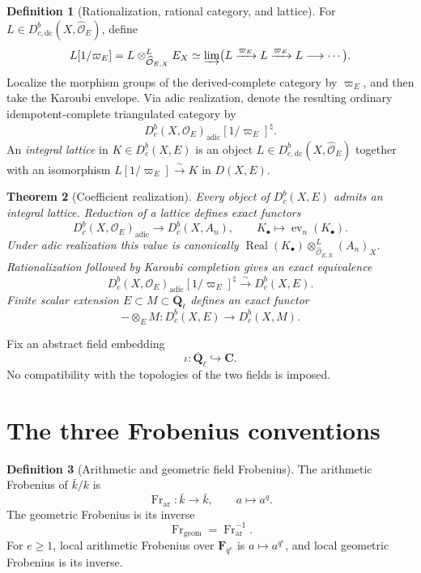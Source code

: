 \documentclass[10pt]{article}
\newtheorem{theorem}{Theorem}[section]
\theoremstyle{definition}
\newtheorem{definition}[theorem]{Definition}
\newcommand{\Qlb}{\overline{\mathbf Q}_\ell}
\newcommand{\Dbc}{D^b_c}
\newcommand{\Fr}{\operatorname{Fr}}
\begin{document}
\begin{definition}[Rationalization, rational category, and lattice]
For \(L\in D^b_{c,\mathrm{dc}}(X,\widehat{\mathcal O}_E)\), define
\[
 L[1/\varpi_E]
   =L\otimes^L_{\widehat{\mathcal O}_{E,X}}E_X
   \simeq\varinjlim\bigl(L\xrightarrow{\varpi_E}L
                  \xrightarrow{\varpi_E}L\longrightarrow\cdots\bigr).
\]
Localize the morphism groups of the derived-complete category by
\(\varpi_E\), and then take the Karoubi envelope.  Via adic realization,
denote the resulting ordinary idempotent-complete triangulated category by
\[
 D^b_c(X,\mathcal O_E)_{\mathrm{adic}}[1/\varpi_E]^\natural.
\]
An \emph{integral lattice} in \(K\in\Dbc(X,E)\) is an object
\(L\in D^b_{c,\mathrm{dc}}(X,\widehat{\mathcal O}_E)\) together with an
isomorphism \(L[1/\varpi_E]\xrightarrow{\sim}K\) in
\(D(X,E)\).
\end{definition}

\begin{theorem}[Coefficient realization]
Every object of \(\Dbc(X,E)\) admits an integral lattice.  Reduction of a
lattice defines exact functors
\[
 D^b_c(X,\mathcal O_E)_{\mathrm{adic}}
   \longrightarrow D^b_c(X,A_n),
 \qquad K_\bullet\longmapsto\operatorname{ev}_n(K_\bullet).
\]
Under adic realization this value is canonically
\(\operatorname{Real}(K_\bullet)\otimes^L_{\widehat{\mathcal O}_{E,X}}
(A_n)_X\).
Rationalization followed by Karoubi completion gives an exact equivalence
\[
 D^b_c(X,\mathcal O_E)_{\mathrm{adic}}[1/\varpi_E]^\natural
        \xrightarrow{\sim}\Dbc(X,E).
\]
Finite scalar extension \(E\subset M\subset\Qlb\) defines an exact functor
\[
             -\otimes_E M:\Dbc(X,E)\longrightarrow\Dbc(X,M).
\]
\end{theorem}

Fix an abstract field embedding
\[
                         \iota:\Qlb\hookrightarrow\mathbf C.
\]
No compatibility with the topologies of the two fields is imposed.

\section{The three Frobenius conventions}

\begin{definition}[Arithmetic and geometric field Frobenius]
The arithmetic Frobenius of \(\bar k/k\) is
\[
 \Fr_{\mathrm{ar}}:\bar k\longrightarrow\bar k,
 \qquad a\longmapsto a^q.
\]
The geometric Frobenius is its inverse
\[
                 \Fr_{\mathrm{geom}}=\Fr_{\mathrm{ar}}^{-1}.
\]
For \(e\ge1\), local arithmetic Frobenius over \(\mathbf F_{q^e}\) is
\(a\mapsto a^{q^e}\), and local geometric Frobenius is its inverse.
\end{definition}
\end{document}
